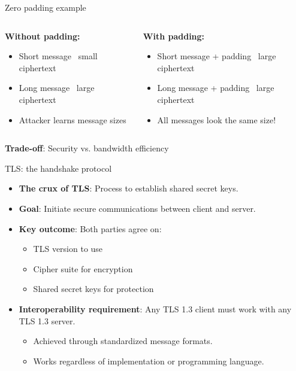 \documentclass[aspectratio=169, lualatex, handout]{beamer}
\begin{document}
\begin{frame}{Zero padding example}
	\begin{columns}[c]
		\begin{column}{0.5\textwidth}
			\textbf{Without padding:}
			\begin{itemize}
				\item Short message \rightarrow\ small ciphertext
				\item Long message \rightarrow\ large ciphertext
				\item Attacker learns message sizes
			\end{itemize}
		\end{column}
		\begin{column}{0.5\textwidth}
			\textbf{With padding:}
			\begin{itemize}
				\item Short message + padding \rightarrow\ large ciphertext
				\item Long message + padding \rightarrow\ large ciphertext
				\item All messages look the same size!
			\end{itemize}
		\end{column}
	\end{columns}
	\pause
	\begin{center}
		\textbf{Trade-off}: Security vs. bandwidth efficiency
	\end{center}
\end{frame}

\begin{frame}{TLS: the handshake protocol}
	\begin{itemize}
		\item \textbf{The crux of TLS}: Process to establish shared secret keys.
		\item \textbf{Goal}: Initiate secure communications between client and server.
		\item \textbf{Key outcome}: Both parties agree on:
		      \begin{itemize}
			      \item TLS version to use
			      \item Cipher suite for encryption
			      \item Shared secret keys for protection
		      \end{itemize}
		\item \textbf{Interoperability requirement}: Any TLS 1.3 client must work with any TLS 1.3 server.
		      \begin{itemize}
			      \item Achieved through standardized message formats.
			      \item Works regardless of implementation or programming language.
		      \end{itemize}
	\end{itemize}
\end{frame}
\end{document}
